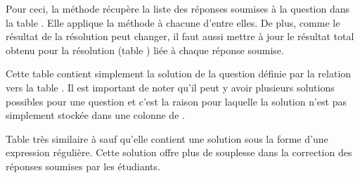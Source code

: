 \documentclass[a4,10pt,french]{sphinxmanual}
\begin{document}
\begin{fulllineitems}
\begin{fulllineitems}
Pour ceci, la méthode récupère la liste des réponses soumises à la question
dans la table . Elle applique la méthode  à 
chacune d'entre elles. De plus,
comme le résultat de la résolution peut changer, il faut aussi mettre à jour
le résultat total obtenu pour la résolution (table ) liée à chaque réponse soumise.

\end{fulllineitems}


\end{fulllineitems}


\begin{fulllineitems}
\label{database:quiz.models.SqAnswer}
Cette table contient simplement la solution de la question définie par la
relation vers la table . Il est important de noter qu'il
peut y avoir plusieurs solutions possibles pour une question et c'est la raison
pour laquelle la solution n'est pas simplement stockée dans une colonne de
{\hyperref[front-end:SimpleQuestion]{\emph{}}}.

\end{fulllineitems}


\begin{fulllineitems}
\label{database:quiz.models.SqRegexAnswer}
Table très similaire à  sauf qu'elle contient une solution sous la
forme d'une expression régulière. Cette solution offre plus de souplesse
dans la correction des réponses soumises par les étudiants.

\end{fulllineitems}

\end{document}
